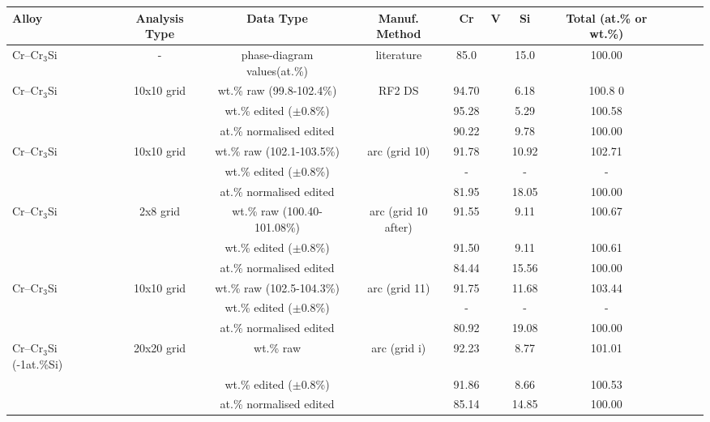 \begin{landscape}
\begin{table}[htdp]
\begin{center}
\begin{tabular}{lcccccccccc}
\hline
Alloy 			&  Analysis Type		&Data Type & Manuf.  Method	&   Cr    &  V       & Si   		& Total (at.\% or wt.\%) \\
\hline\hline
Cr--Cr$_3$Si&  		-			&phase-diagram values(at.\%)	& literature&85.0		&      	&   15.0    	&100.00\\

Cr--Cr$_3$Si& 10x10 grid 			&wt.\% raw (99.8-102.4\%)&	RF2 DS 		&94.70		&		&   6.18	&100.8	0\\
		 	   & 					&wt.\% edited ($\pm$0.8\%) 	&  			&95.28		&		&   5.29	&100.58\\
			   &						&at.\% normalised	 edited &	 		&90.22		&		&   9.78    	&100.00\\

Cr--Cr$_3$Si& 10x10 grid 		&wt.\% raw (102.1-103.5\%)&arc (grid 10)&91.78	&		&   10.92	&102.71\\
		 	   & 					&wt.\% edited ($\pm$0.8\%) 	&  			&-		&		&   -	&-\\
			   &						&at.\% normalised	 edited &	 		&	81.95	&		&     18.05  	&100.00\\

Cr--Cr$_3$Si& 2x8 grid 		&wt.\% raw (100.40-101.08\%)&arc (grid 10 after)&91.55	&		&   9.11	&100.67\\
		 	   & 					&wt.\% edited ($\pm$0.8\%) 	&  			&91.50		&		&   9.11	&100.61\\
			   &						&at.\% normalised	 edited &	 		&84.44		&		&     15.56  	&100.00\\

Cr--Cr$_3$Si& 10x10 grid 		&wt.\% raw (102.5-104.3\%)& arc (grid 11) &91.75	&		&   11.68	&103.44\\
		 	   & 					&wt.\% edited ($\pm$0.8\%) 	&  			&-		&		&   -	&-\\
			   &						&at.\% normalised	 edited &	 		&80.92	&		&     19.08  	&100.00\\

Cr--Cr$_3$Si (-1at.\%Si) &20x20 grid &wt.\% raw			&arc (grid i)&92.23	&		&   8.77    	&101.01\\
			   &				   		&wt.\% edited ($\pm$0.8\%) & 			&91.86		&		&   8.66    	&100.53\\
			   &				   		&at.\% normalised	 edited	& 			&85.14		&		&   14.85  	&100.00\\


\end{tabular}
\end{center}
\end{table}
\end{landscape}
